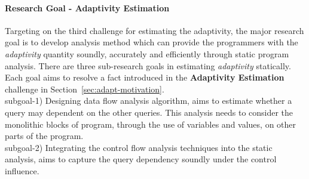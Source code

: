 \paragraph{Research Goal - Adaptivity Estimation}
Targeting on the third challenge
for estimating the adaptivity, 
the major research goal is to develop analysis method which can
provide the programmers with the \emph{adaptivity} quantity
soundly, accurately and
efficiently
through static program analysis.
There are three sub-research goals in estimating \emph{adaptivity} statically.
Each goal aims to resolve a fact introduced in the \textbf{Adaptivity Estimation} challenge in Section~\ref{sec:adapt-motivation}.
\\
subgoal-1) Designing data flow analysis algorithm, aims to estimate whether a query may dependent on the other queries. 
This analysis needs to consider the monolithic blocks of program, through the use of variables and values, on other parts of the program.
\\
subgoal-2) Integrating the control flow analysis techniques into the static analysis,
 aims to 
capture the query dependency soundly
under the control influence.
